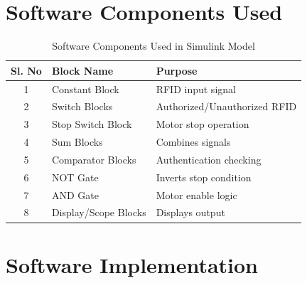 \documentclass[12pt,a4paper,oneside]{report}
\begin{document}
\vspace{0.5cm}

\section{Software Components Used}

\begin{table}[H]
\centering
\renewcommand{\arraystretch}{1.3}

\begin{tabular}{|c|p{4cm}|p{5cm}|}
\hline

\textbf{Sl. No} & \centering \textbf{Block Name} & \centering \textbf{Purpose} \arraybackslash \\

\hline

1 & Constant Block & RFID input signal \\

\hline

2 & Switch Blocks & Authorized/Unauthorized RFID \\

\hline

3 & Stop Switch Block & Motor stop operation \\

\hline

4 & Sum Blocks & Combines signals \\

\hline

5 & Comparator Blocks & Authentication checking \\

\hline

6 & NOT Gate & Inverts stop condition \\

\hline

7 & AND Gate & Motor enable logic \\

\hline

8 & Display/Scope Blocks & Displays output \\

\hline

\end{tabular}

\caption{Software Components Used in Simulink Model}

\end{table}

\section{Software Implementation}
\end{document}
